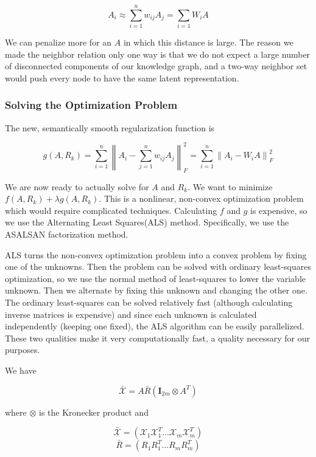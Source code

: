 \documentclass[pageno]{jpaper}
\newcommand{\norm}[1]{\left\lVert#1\right\rVert}
\begin{document}
$$ A_i \approx \sum_{i=1}^n w_{ij}A_j = \sum_{i=1} W_iA$$

 We can penalize more for an $A$ in which this distance is large. The reason we
 made the neighbor relation only one way is that we do not expect a large number
 of disconnected components of our knowledge graph, and a two-way neighbor set
 would push every node to have the same latent representation. \\

\subsubsection{Solving the Optimization Problem}
\label{Solving the Optimization Problem}

The new, semantically smooth regularization function is

\begin{equation}
    \label{eq: new g}
    g(A, R_k) = \sum_{i=1}^n \norm{A_i - \sum_{j=1}^n w_{ij}A_j}_F^2 =
    \sum_{i=1}^n \norm{A_i - W_iA}_F^2
\end{equation}

We are now ready to actually solve for $A$ and $R_k$. We want to minimize $f(A,
R_k) + \lambda g(A, R_k)$. This is a nonlinear, non-convex optimization problem
which would require complicated techniques. Calculating $f$ and $g$ is
expensive, so we use the Alternating Least Squares(ALS) method\cite{Koren2009}.
Specifically, we use the ASALSAN factorization method\cite{Bader2007}.

ALS turns the non-convex optimization problem into a convex problem by fixing
one of the unknowns. Then the problem can be solved with ordinary least-squares
optimization, so we use the normal method of least-squares to lower the
variable unknown. Then we alternate by fixing this unknown and changing the
other one. The ordinary least-squares can be solved relatively fast (although
calculating inverse matrices is expensive) and since each unknown is calculated
independently (keeping one fixed), the ALS algorithm can be easily parallelized.
These two qualities make it very computationally fast, a quality necessary for
our purposes.

We have

$$\bar{\mathcal{X}} = A\bar{R}(\mathbf{I}_{2m} \otimes A^T)$$

where $\otimes$ is the Kronecker product and

$$\bar{\mathcal{X}} = \left( \mathcal{X}_1\mathcal{X}_1^T ... \mathcal{X}_m\mathcal{X}_m^T \right)$$
$$\bar{R} = \left( R_1 R_1^T ... R_mR_m^T \right)$$
\end{document}
